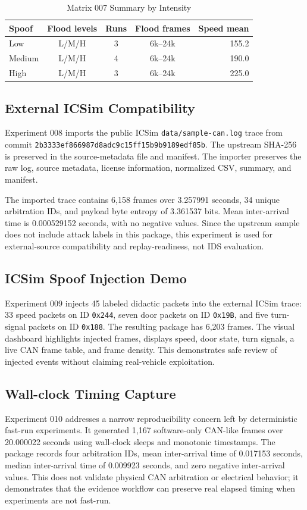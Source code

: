 \documentclass[conference]{IEEEtran}
\begin{document}
\begin{table}[t]
\caption{Matrix 007 Summary by Intensity}
\label{tab:matrix}
\centering
\footnotesize
\begin{tabular}{lcccr}
\toprule
Spoof & Flood levels & Runs & Flood frames & Speed mean \\
\midrule
Low & L/M/H & 3 & 6k--24k & 155.2 \\
Medium & L/M/H & 4 & 6k--24k & 190.0 \\
High & L/M/H & 3 & 6k--24k & 225.0 \\
\bottomrule
\end{tabular}
\end{table}

\subsection{External ICSim Compatibility}
Experiment 008 imports the public ICSim \texttt{data/sample-can.log} trace from commit \texttt{2b3333ef866987d8adc9c15ff15b9b9189edf85b}. The upstream SHA-256 is preserved in the source-metadata file and manifest. The importer preserves the raw log, source metadata, license information, normalized CSV, summary, and manifest.

The imported trace contains 6,158 frames over 3.257991 seconds, 34 unique arbitration IDs, and payload byte entropy of 3.361537 bits. Mean inter-arrival time is 0.000529152 seconds, with no negative values. Since the upstream sample does not include attack labels in this package, this experiment is used for external-source compatibility and replay-readiness, not IDS evaluation.

\subsection{ICSim Spoof Injection Demo}
Experiment 009 injects 45 labeled didactic packets into the external ICSim trace: 33 speed packets on ID \texttt{0x244}, seven door packets on ID \texttt{0x19B}, and five turn-signal packets on ID \texttt{0x188}. The resulting package has 6,203 frames. The visual dashboard highlights injected frames, displays speed, door state, turn signals, a live CAN frame table, and frame density. This demonstrates safe review of injected events without claiming real-vehicle exploitation.

\subsection{Wall-clock Timing Capture}
Experiment 010 addresses a narrow reproducibility concern left by deterministic fast-run experiments. It generated 1,167 software-only CAN-like frames over 20.000022 seconds using wall-clock sleeps and monotonic timestamps. The package records four arbitration IDs, mean inter-arrival time of 0.017153 seconds, median inter-arrival time of 0.009923 seconds, and zero negative inter-arrival values. This does not validate physical CAN arbitration or electrical behavior; it demonstrates that the evidence workflow can preserve real elapsed timing when experiments are not fast-run.
\end{document}
